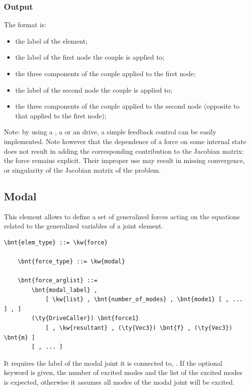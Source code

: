 \subsubsection{Output}
The format is:
\begin{itemize}
    \item the label of the element;
    \item the label of the first node the couple is applied to;
    \item the three components of the couple applied to the first node;
    \item the label of the second node the couple is applied to;
    \item the three components of the couple applied to the second node
	  (opposite to that applied to the first node);
\end{itemize}

\bigskip
Note: by using a , a  or an  drive,
a simple feedback control can be easily implemented.
Note however that the dependence of a force on some internal state
does not result in adding the corresponding contribution 
to the Jacobian matrix: the force remains explicit.
Their improper use may result in missing convergence,
or singularity of the Jacobian matrix of the problem.

\subsection{Modal}
\label{sec:EL:FORCE:MODAL}
This element allows to define a set of generalized forces
acting on the equations related to the generalized variables
of a  joint element.
\begin{Verbatim}[commandchars=\\\{\}]
    \bnt{elem_type} ::= \kw{force}

    \bnt{force_type} ::= \kw{modal}

    \bnt{force_arglist} ::=
        \bnt{modal_label} ,
            [ \kw{list} , \bnt{number_of_modes} , \bnt{mode1} [ , ... ] , ]
        (\ty{DriveCaller}) \bnt{force1}
            [ , \kw{resultant} , (\ty{Vec3}) \bnt{f} , (\ty{Vec3}) \bnt{m} ]
        [ , ... ]
\end{Verbatim}
It requires the label of the modal joint it is connected to,
.
If the optional keyword  is given, the number of excited modes
 and the list of the excited modes is expected,
otherwise it assumes all modes of the  modal joint
will be excited.

